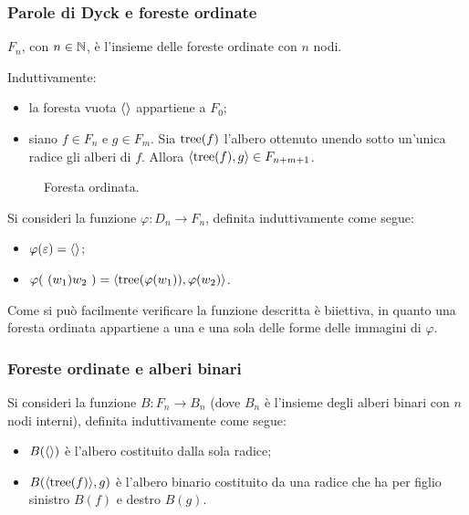 \subsubsection{Parole di Dyck e foreste ordinate}
$F_n$, con $n\in\mathbb N$, è l'insieme delle foreste ordinate con $n$ nodi.
\begin{defin}
	Induttivamente:
	\begin{itemize}
		\item la foresta vuota $\langle  \rangle$ appartiene a $F_0$;
		\item siano $f\in F_n$ e $g\in F_m$. Sia $\mathrm{tree}(f)$ l'albero ottenuto unendo sotto un'unica radice gli alberi di $f$. Allora $\langle \mathrm{tree}(f),g \rangle\in F_{n+m+1}$.
	\end{itemize}
\end{defin}

\begin{figure}[ht]
	\centering
	
	\caption{Foresta ordinata.}
	\label{fig:ordered_forest}
\end{figure}

Si consideri la funzione $\varphi:D_n\to F_n$, definita induttivamente come segue:
\begin{itemize}
	\item $\varphi(\varepsilon)=\langle  \rangle$;
	\item $\varphi(~(w_1)w_2~)=\langle \mathrm{tree}(\varphi(w_1)),\varphi(w_2) \rangle$.
\end{itemize}

Come si può facilmente verificare la funzione descritta è biiettiva, in quanto una foresta ordinata appartiene a una e una sola delle forme delle immagini di $\varphi$.


\subsubsection{Foreste ordinate e alberi binari}
Si consideri la funzione $B:F_n\to B_n$ (dove $B_n$ è l'insieme degli alberi binari con $n$ nodi interni), definita induttivamente come segue:
\begin{itemize}
	\item $B(\langle  \rangle)$ è l'albero costituito dalla sola radice;
	\item $B(\langle \mathrm{tree}(f) \rangle,g)$ è l'albero binario costituito da una radice che ha per figlio sinistro $B(f)$ e destro $B(g)$.
\end{itemize}

